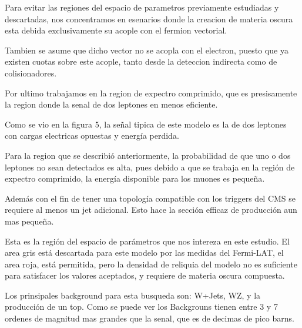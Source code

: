 \documentclass[12pt,letterpaper]{article}
\newcounter{example}[enumi]
\begin{document}
	\begin{tcolorbox}[title= Slide \arabic{example} ]
	Para evitar las regiones del espacio de parametros previamente estudiadas y descartadas, nos concentramos en esenarios donde la creacion de materia oscura esta debida exclusivamente su acople con el fermion vectorial.
	
	Tambien se asume que dicho vector no se acopla con el electron, puesto que ya existen cuotas sobre este acople, tanto desde la deteccion indirecta como de colisionadores.
	
	Por ultimo trabajamos en la region de expectro comprimido, que es presisamente la region donde la senal de dos leptones en menos eficiente.
	
	\end{tcolorbox}
	
	\begin{tcolorbox}[title= Slide \arabic{example} ]
	Como se vio en la figura 5, la señal tipica de este modelo es la de dos leptones con cargas electricas opuestas y energía perdida.
	
	Para la region que se describió anteriormente, la probabilidad de que uno o dos leptones no sean detectados es alta, pues debido a que se trabaja en la región de expectro comprimido, la energía disponible para los muones es pequeña.
	
	Además con el fin de tener una topología compatible con los triggers del CMS se requiere al menos un jet adicional. Esto hace la sección efficaz de producción aun mas pequeña.
	\end{tcolorbox}
	
	\begin{tcolorbox}[title= Slide \arabic{example} ] %
	Esta es la región del espacio de parámetros que nos intereza en este estudio. El area gris está descartada para este modelo por las medidas del Fermi-LAT, el area roja, está permitida, pero la densidad de reliquia del modelo no es suficiente para satisfacer los valores aceptados, y requiere de materia oscura compuesta.
	\end{tcolorbox}
	
	\begin{tcolorbox}[title= Slide \arabic{example} ]
	Los prinsipales background para esta busqueda son: W+Jets, WZ, y la producción de un top. Como se puede ver los Backgrouns tienen entre 3 y 7 ordenes de magnitud mas grandes que la senal, que es de decimas de pico barns. 
	
	\end{tcolorbox}
	
\end{document}
